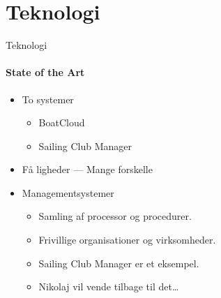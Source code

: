 \section{Teknologi}

\begin{frame}{Teknologi}
  \framesubtitle{State of the Art}
  
  \begin{itemize}
    \item To systemer
    \begin{itemize}
      \item BoatCloud
      \item Sailing Club Manager
    \end{itemize}
    \item Få ligheder --- Mange forskelle
    \vspace{2mm}
    \item Managementsystemer
    \begin{itemize}
      \item Samling af processor og procedurer.
      \item Frivillige organisationer og virksomheder.
      \item Sailing Club Manager er et eksempel.
      \item Nikolaj vil vende tilbage til det\ldots
    \end{itemize}
  \end{itemize}
\end{frame}
